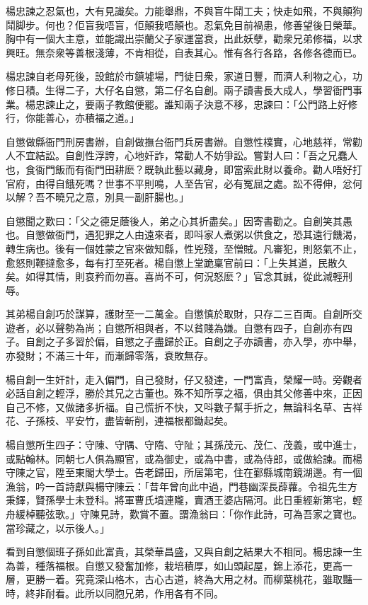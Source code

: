 \documentclass[a5paper, 12pt, openany]{book} %
\begin{document}
	楊忠諫之忍氣也，大有見識矣。力能舉鼎，不與盲牛鬦工夫；快走如飛，不與顛狗鬦脚步。何也？佢盲我唔盲，佢顛我唔顛也。忍氣免目前禍患，修善望後日榮華。胸中有一個大主意，並能識出崇蘭父子家運當衰，出此妖孽，勸衆兄弟修福，以求興旺。無奈衆等善根淺薄，不肯相從，自表其心。惟有各行各路，各修各德而已。

	楊忠諫自老母死後，設館於市鎮墟場，門徒日衆，家道日豐，而濟人利物之心，功修日積。生得二子，大仔名自懲，第二仔名自創。兩子讀書長大成人，學習衙門事業。楊忠諫止之，要兩子教館便罷。誰知兩子決意不移，忠諫曰：「公門路上好修行，你能善心，亦積福之道。」

	自懲做縣衙門刑房書辦，自創做撫台衙門兵房書辦。自懲性樸實，心地慈祥，常勸人不宜結訟。自創性浮誇，心地奸詐，常勸人不妨爭訟。嘗對人曰：「吾之兄蠢人也，食衙門飯而有衙門田耕麽？既執此藝以藏身，即當索此財以養命。勸人唔好打官府，由得自餓死嗎？世事不平則鳴，人至告官，必有冤屈之處。訟不得伸，忿何以解？吾不曉兄之意，別具一副肝腸也。」

	自懲聞之歎曰：「父之德足蔭後人，弟之心其折盡矣。」因寄書勸之。自創笑其愚也。自懲做衙門，遇犯罪之人由遠來者，即呌家人煮粥以供食之，恐其遠行饑渴，轉生病也。後有一個姓蒙之官來做知縣，性兇殘，至憎賊。凡審犯，則怒氣不止，愈怒則鞭撻愈多，每有打至死者。楊自懲上堂跪稟官前曰：「上失其道，民散久矣。如得其情，則哀矜而勿喜。喜尚不可，何況怒麽？」官念其誠，從此減輕刑辱。

	其弟楊自創巧於謀算，護財至一二萬金。自懲慎於取財，只存二三百両。自創所交遊者，必以聲勢為尚；自懲所相與者，不以貧賤為嫌。自懲有四子，自創亦有四子。自創之子多習於偏，自懲之子盡歸於正。自創之子亦讀書，亦入學，亦中舉，亦發財；不滿三十年，而漸歸零落，衰敗無存。

	楊自創一生奸計，走入偏門，自己發財，仔又發達，一門富貴，榮耀一時。旁觀者必話自創之輕浮，勝於其兄之古董也。殊不知所享之福，俱由其父修善中來，正因自己不修，又做諸多折福。自己慌折不快，又呌數子幫手折之，無論科名草、吉祥花、子孫枝、平安竹，盡皆斬削，連福根都鋤起矣。

	楊自懲所生四子：守陳、守隅、守隋、守阯；其孫茂元、茂仁、茂義，或中進士，或點翰林。同朝七人俱為顯官，或為御史，或為中書，或為侍郎，或做給諫。而楊守陳之官，陞至東閣大學士。告老歸田，所居第宅，住在鄞縣城南鏡湖邊。有一個漁翁，吟一首詩獻與楊守陳云：「昔年曾向此中過，門巷幽深長薜蘿。令祖先生方秉鐸，賢孫學士未登科。將軍曹氏墳連隴，賣酒王婆店隔河。此日重經新第宅，輕舟緩棹聽弦歌。」守陳見詩，歎賞不置。謂漁翁曰：「你作此詩，可為吾家之寶也。當珍藏之，以示後人。」

	看到自懲個班子孫如此富貴，其榮華昌盛，又與自創之結果大不相同。楊忠諫一生為善，種落福根。自懲又發奮加修，栽培積厚，如山頭起屋，錦上添花，更高一層，更勝一着。究竟深山格木，古心古道，終為大用之材。而柳葉桃花，雖取豔一時，終非耐看。此所以同胞兄弟，作用各有不同。
\end{document}
